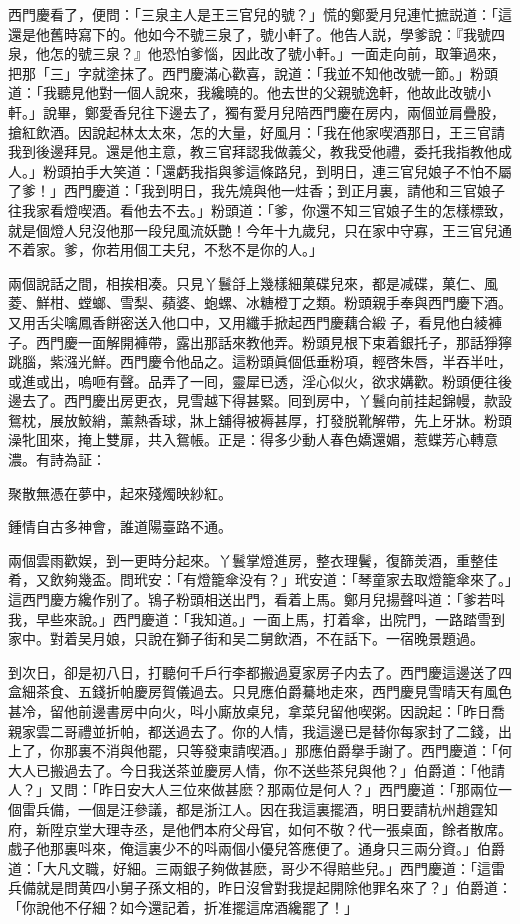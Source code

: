 西門慶看了，便問：「三泉主人是王三官兒的號？」慌的鄭愛月兒連忙摭説道：「這還是他舊時寫下的。他如今不號三泉了，號小軒了。他告人説，學爹說：『我號四泉，他怎的號三泉？』他恐怕爹惱，因此改了號小軒。」一面走向前，取筆過來，把那「三」字就塗抹了。西門慶滿心歡喜，說道：「我並不知他改號一節。」粉頭道：「我聽見他對一個人說來，我纔曉的。他去世的父親號逸軒，他故此改號小軒。」說畢，鄭愛香兒往下邊去了，獨有愛月兒陪西門慶在房内，兩個並肩疊股，搶紅飲酒。因說起林太太來，怎的大量，好風月：「我在他家喫酒那日，王三官請我到後邊拜見。還是他主意，教三官拜認我做義父，教我受他禮，委托我指教他成人。」粉頭拍手大笑道：「還虧我指與爹這條路兒，到明日，連三官兒娘子不怕不屬了爹！」西門慶道：「我到明日，我先燒與他一炷香；到正月裏，請他和三官娘子往我家看燈喫酒。看他去不去。」粉頭道：「爹，你還不知三官娘子生的怎樣標致，就是個燈人兒沒他那一段兒風流妖艷！今年十九歲兒，只在家中守寡，王三官兒通不着家。爹，你若用個工夫兒，不愁不是你的人。」

兩個說話之間，相挨相凑。只見丫鬟㧱上幾樣細菓碟兒來，都是减碟，菓仁、風菱、鮮柑、螳螂、雪梨、蘋婆、蚫螺、冰糖橙丁之類。粉頭親手奉與西門慶下酒。又用舌尖噙鳳香餅密送入他口中，又用纖手掀起西門慶藕合緞𧜽子，看見他白綾褲子。西門慶一面解開褲帶，露出那話來教他弄。粉頭見根下束着銀托子，那話猙獰跳腦，紫漒光鮮。西門慶令他品之。這粉頭眞個低垂粉項，輕啓朱唇，半吞半吐，或進或出，嗚咂有聲。品弄了一囘，靈犀已透，淫心似火，欲求媾歡。粉頭便往後邊去了。西門慶出房更衣，見雪越下得甚緊。囘到房中，丫鬟向前挂起錦幔，款設鴛枕，展放鮫綃，薰熱香球，牀上舖得被褥甚厚，打發脱靴解帶，先上牙牀。粉頭澡牝囬來，掩上雙扉，共入鴛帳。正是：得多少動人春色嬌還媚，惹蝶芳心轉意濃。有詩為証：

\begin{myquote}
聚散無憑在夢中，起來殘燭映紗紅。

鍾情自古多神會，誰道陽臺路不通。
\end{myquote}

兩個雲雨歡娱，到一更時分起來。丫鬟掌燈進房，整衣理鬢，復篩羙酒，重整佳肴，又飲夠幾盃。問玳安：「有燈籠傘没有？」玳安道：「琴童家去取燈籠傘來了。」這西門慶方纔作别了。鴇子粉頭相送出門，看着上馬。鄭月兒揚聲呌道：「爹若呌我，早些來說。」西門慶道：「我知道。」一面上馬，打着傘，出院門，一路踏雪到家中。對着吴月娘，只說在獅子街和吴二舅飲酒，不在話下。一宿晚景題過。

到次日，卻是初八日，打聽何千戶行李都搬過夏家房子内去了。西門慶這邊送了四盒細茶食、五錢折帕慶房賀儀過去。只見應伯爵驀地走來，西門慶見雪晴天有風色甚冷，留他前邊書房中向火，呌小廝放桌兒，拿菜兒留他喫粥。因說起：「昨日喬親家雲二哥禮並折帕，都送過去了。你的人情，我這邊已是替你每家封了二錢，出上了，你那裏不消與他罷，只等發柬請喫酒。」那應伯爵擧手謝了。西門慶道：「何大人已搬過去了。今日我送茶並慶房人情，你不送些茶兒與他？」伯爵道：「他請人？」又問：「昨日安大人三位來做甚麽？那兩位是何人？」西門慶道：「那兩位一個雷兵備，一個是汪參議，都是浙江人。因在我這裏擺酒，明日要請杭州趙霆知府，新陞京堂大理寺丞，是他們本府父母官，如何不敬？代一張桌面，餘者散席。戲子他那裏呌來，俺這裏少不的呌兩個小優兒答應便了。通身只三兩分資。」伯爵道：「大凡文職，好細。三兩銀子夠做甚麽，哥少不得賠些兒。」西門慶道：「這雷兵備就是問黄四小舅子孫文相的，昨日沒曾對我提起開除他罪名來了？」伯爵道：「你說他不仔細？如今還記着，折准擺這席酒纔罷了！」

